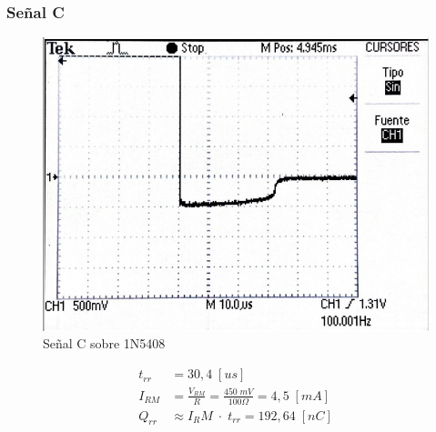 \documentclass{article}
\begin{document}
\subsubsection{Señal C}
\begin{figure}[h]
 \begin{center}
	\includegraphics[scale=0.5]{imagenes/1N5408_C.jpg} 
	\caption{Señal C sobre 1N5408}
 \end{center}
\end{figure}
%
\begin{align*}
	t_{rr} &= 30,4 \; [us] \\
	I_{RM}	&= \frac{V_{RM}}{R} = \frac{450 \; mV}{100 \Omega} = 4,5 \; [mA] \\
	Q_{rr}	&\approx {I_RM} \; \cdot \; t_{rr} = 192,64 \; [nC]
\end{align*}
%
\end{document}
